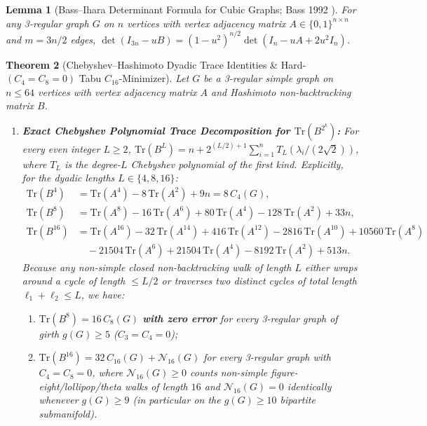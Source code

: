 \documentclass[10pt,a4paper]{article}
\newtheorem{theorem}{Theorem}[section]
\newtheorem{lemma}[theorem]{Lemma}
\theoremstyle{definition}
\theoremstyle{remark}
\begin{document}
\begin{lemma}[Bass--Ihara Determinant Formula for Cubic Graphs; Bass 1992 \cite{bass1992ihara}]\label{lem:bass}
For any 3-regular graph $G$ on $n$ vertices with vertex adjacency matrix $A \in \{0, 1\}^{n \times n}$ and $m = 3n/2$ edges, $\det(I_{3n} - u B) = (1 - u^2)^{n/2} \det(I_n - u A + 2 u^2 I_n)$.
\end{lemma}

\begin{theorem}[Chebyshev--Hashimoto Dyadic Trace Identities \& Hard-$(C_4=C_8=0)$ Tabu $C_{16}$-Minimizer]\label{thm:hashimoto}
Let $G$ be a 3-regular simple graph on $n \le 64$ vertices with vertex adjacency matrix $A$ and Hashimoto non-backtracking matrix $B$.
\begin{enumerate}[label=(\alph*),nosep]
  \item \textbf{Exact Chebyshev Polynomial Trace Decomposition for $\mathrm{Tr}(B^{2^k})$:} For every even integer $L \ge 2$, $\mathrm{Tr}(B^L) = n + 2^{(L/2)+1} \sum_{i=1}^n T_L(\lambda_i / (2\sqrt{2}))$, where $T_L$ is the degree-$L$ Chebyshev polynomial of the first kind. Explicitly, for the dyadic lengths $L \in \{4, 8, 16\}$:
  \begin{align}
    \mathrm{Tr}(B^4) &= \mathrm{Tr}(A^4) - 8\,\mathrm{Tr}(A^2) + 9n = 8\,C_4(G), \label{eq:trb4}\\
    \mathrm{Tr}(B^8) &= \mathrm{Tr}(A^8) - 16\,\mathrm{Tr}(A^6) + 80\,\mathrm{Tr}(A^4) - 128\,\mathrm{Tr}(A^2) + 33n, \label{eq:trb8}\\
    \mathrm{Tr}(B^{16}) &= \mathrm{Tr}(A^{16}) - 32\,\mathrm{Tr}(A^{14}) + 416\,\mathrm{Tr}(A^{12}) - 2816\,\mathrm{Tr}(A^{10}) + 10560\,\mathrm{Tr}(A^8) \nonumber\\
    &\quad - 21504\,\mathrm{Tr}(A^6) + 21504\,\mathrm{Tr}(A^4) - 8192\,\mathrm{Tr}(A^2) + 513n. \label{eq:trb16}
  \end{align}
  Because any non-simple closed non-backtracking walk of length $L$ either wraps around a cycle of length $\le L/2$ or traverses two distinct cycles of total length $\ell_1 + \ell_2 \le L$, we have:
  \begin{enumerate}[label=(\roman*),nosep]
    \item $\mathrm{Tr}(B^8) = 16\,C_8(G)$ \textbf{with zero error} for every 3-regular graph of girth $g(G) \ge 5$ ($C_3 = C_4 = 0$);
    \item $\mathrm{Tr}(B^{16}) = 32\,C_{16}(G) + \mathcal{N}_{16}(G)$ for every 3-regular graph with $C_4 = C_8 = 0$, where $\mathcal{N}_{16}(G) \ge 0$ counts non-simple figure-eight/lollipop/theta walks of length $16$ and $\mathcal{N}_{16}(G) = 0$ identically whenever $g(G) \ge 9$ (in particular on the $g(G) \ge 10$ bipartite submanifold).

\end{enumerate}
\end{enumerate}
\end{theorem}
\end{document}
